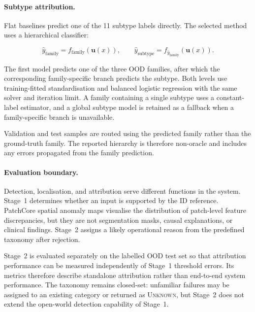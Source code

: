 \documentclass[fleqn,12pt]{olplainarticle}
\begin{document}
\paragraph{Subtype attribution.}
Flat baselines predict one of the 11 subtype labels directly. The selected
method uses a hierarchical classifier:

\begin{equation}
    \widehat{y}_{\mathrm{family}}
    =
    f_{\mathrm{family}}
    \left(
        \mathbf{u}(x)
    \right),
    \qquad
    \widehat{y}_{\mathrm{subtype}}
    =
    f_{\widehat{y}_{\mathrm{family}}}
    \left(
        \mathbf{u}(x)
    \right).
    \label{eq:method_stage2_hierarchy}
\end{equation}

The first model predicts one of the three OOD families, after which the
corresponding family-specific branch predicts the subtype. Both levels use
training-fitted standardisation and balanced logistic regression with the same
solver and iteration limit. A family containing a single subtype uses a
constant-label estimator, and a global subtype model is retained as a fallback
when a family-specific branch is unavailable.

Validation and test samples are routed using the predicted family rather than
the ground-truth family. The reported hierarchy is therefore non-oracle and
includes any errors propagated from the family prediction.

\paragraph{Evaluation boundary.}
Detection, localisation, and attribution serve different functions in the
system. Stage~1 determines whether an input is supported by the ID reference.
PatchCore spatial anomaly maps visualise the distribution of patch-level
feature discrepancies, but they are not segmentation masks, causal
explanations, or clinical findings. Stage~2 assigns a likely operational
reason from the predefined taxonomy after rejection.

Stage~2 is evaluated separately on the labelled OOD test set so that
attribution performance can be measured independently of Stage~1 threshold
errors. Its metrics therefore describe standalone attribution rather than
end-to-end system performance. The taxonomy remains closed-set: unfamiliar
failures may be assigned to an existing category or returned as
\textsc{Unknown}, but Stage~2 does not extend the open-world detection
capability of Stage~1.
\end{document}
